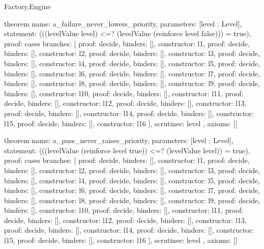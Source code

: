 \begin{lexlean}{Factory.Engine}
\begin{semanticmodule}
theorem{
  name: a_failure_never_lowers_priority,
  parameters: [level : Level],
  statement: (((levelValue level) <=? (levelValue (reinforce level false))) = true),
  proof: cases{
    branches: [
      {proof: decide{}, binders: [], constructor: l1},
      {proof: decide{}, binders: [], constructor: l2},
      {proof: decide{}, binders: [], constructor: l3},
      {proof: decide{}, binders: [], constructor: l4},
      {proof: decide{}, binders: [], constructor: l5},
      {proof: decide{}, binders: [], constructor: l6},
      {proof: decide{}, binders: [], constructor: l7},
      {proof: decide{}, binders: [], constructor: l8},
      {proof: decide{}, binders: [], constructor: l9},
      {proof: decide{}, binders: [], constructor: l10},
      {proof: decide{}, binders: [], constructor: l11},
      {proof: decide{}, binders: [], constructor: l12},
      {proof: decide{}, binders: [], constructor: l13},
      {proof: decide{}, binders: [], constructor: l14},
      {proof: decide{}, binders: [], constructor: l15},
      {proof: decide{}, binders: [], constructor: l16}
    ],
    scrutinee: level
  },
  axioms: []
}

theorem{
  name: a_pass_never_raises_priority,
  parameters: [level : Level],
  statement: (((levelValue (reinforce level true)) <=? (levelValue level)) = true),
  proof: cases{
    branches: [
      {proof: decide{}, binders: [], constructor: l1},
      {proof: decide{}, binders: [], constructor: l2},
      {proof: decide{}, binders: [], constructor: l3},
      {proof: decide{}, binders: [], constructor: l4},
      {proof: decide{}, binders: [], constructor: l5},
      {proof: decide{}, binders: [], constructor: l6},
      {proof: decide{}, binders: [], constructor: l7},
      {proof: decide{}, binders: [], constructor: l8},
      {proof: decide{}, binders: [], constructor: l9},
      {proof: decide{}, binders: [], constructor: l10},
      {proof: decide{}, binders: [], constructor: l11},
      {proof: decide{}, binders: [], constructor: l12},
      {proof: decide{}, binders: [], constructor: l13},
      {proof: decide{}, binders: [], constructor: l14},
      {proof: decide{}, binders: [], constructor: l15},
      {proof: decide{}, binders: [], constructor: l16}
    ],
    scrutinee: level
  },
  axioms: []
}


\end{semanticmodule}
\end{lexlean}

